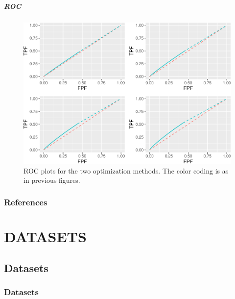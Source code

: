\documentclass[
]{book}
\begin{document}
\hypertarget{roc-10}{%
\subsubsection{ROC}\label{roc-10}}

\begin{figure}
\centering
\includegraphics{22-optim-op-point_files/figure-latex/optim-op-point-low-performance-vary-nu-vary-all-roc-1.pdf}
\caption{\label{fig:optim-op-point-low-performance-vary-nu-vary-all-roc}ROC plots for the two optimization methods. The color coding is as in previous figures.}
\end{figure}

\hypertarget{optim-op-point-appendices-references}{%
\section{References}\label{optim-op-point-appendices-references}}

\hypertarget{part-datasets}{%
\part*{DATASETS}\label{part-datasets}}

\hypertarget{datasets}{%
\chapter{Datasets}\label{datasets}}

\hypertarget{datasets-datasets}{%
\section{Datasets}\label{datasets-datasets}}
\end{document}
